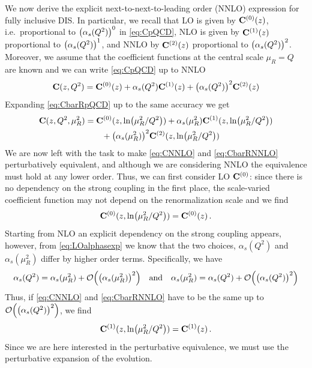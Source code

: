 We now derive the explicit next-to-next-to-leading order (NNLO) expression for fully inclusive DIS.
In particular, we recall that LO is given by $\vb C^{(0)}(z)$, i.e.\ proportional to $\qty(\alpha_s(Q^2))^0$ in \cref{eq:CpQCD}, NLO is given by $\vb C^{(1)}(z)$ proportional to $\qty(\alpha_s(Q^2))^1$, and NNLO by $\vb C^{(2)}(z)$ proportional to $\qty(\alpha_s(Q^2))^2$.
Moreover, we assume that the coefficient functions at the central scale $\mu_R=Q$ are known and we can write \cref{eq:CpQCD} up to NNLO
\begin{equation}
    \vb C(z,Q^2) = \vb C^{(0)}(z) + \alpha_s(Q^2) \vb C^{(1)}(z) + \qty(\alpha_s(Q^2))^2 \vb C^{(2)}(z) \label{eq:CNNLO}
\end{equation}
Expanding \cref{eq:CbarRpQCD} up to the same accuracy we get
\begin{align}
    \vb C(z,Q^2,\mu_R^2) &= \vb C^{(0)}(z,\ln(\mu_R^2/Q^2)) + \alpha_s(\mu_R^2) \vb C^{(1)}(z,\ln(\mu_R^2/Q^2)) \nonumber\\
    &\hspace{20pt} + \qty(\alpha_s(\mu_R^2))^2 \vb C^{(2)}(z,\ln(\mu_R^2/Q^2)) \label{eq:CbarRNNLO}
\end{align}
We are now left with the task to make \cref{eq:CNNLO} and \cref{eq:CbarRNNLO} perturbatively equivalent, and although we are considering NNLO the equivalence must hold at any lower order.
Thus, we can first consider LO $\vb C^{(0)}$: since there is no dependency on the strong coupling in the first place, the scale-varied coefficient function may not depend on the renormalization scale and we find
\begin{equation}
    \vb C^{(0)}(z,\ln(\mu_R^2/Q^2)) = \vb C^{(0)}(z)\,.
\end{equation}
Starting from NLO an explicit dependency on the strong coupling appears, however, from \cref{eq:LOalphasexp} we know that the two choices, $\alpha_s(Q^2)$ and $\alpha_s(\mu_R^2)$ differ by higher order terms.
Specifically, we have
\begin{equation}
    \alpha_s(Q^2) = \alpha_s(\mu_R^2) + \order{\qty(\alpha_s(\mu_R^2))^2} \qq{and} \alpha_s(\mu_R^2) = \alpha_s(Q^2) + \order{\qty(\alpha_s(Q^2))^2}
\end{equation}
Thus, if \cref{eq:CNNLO} and \cref{eq:CbarRNNLO} have to be the same up to $\order{\qty(\alpha_s(Q^2))^2}$, we find
\begin{equation}
    \vb C^{(1)}(z,\ln(\mu_R^2/Q^2)) = \vb C^{(1)}(z)\,.
\end{equation}
Since we are here interested in the perturbative equivalence, we must use the perturbative expansion of the evolution.

